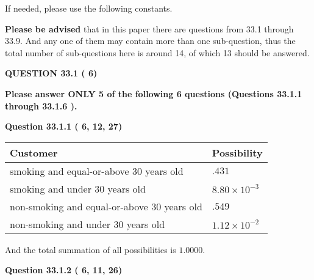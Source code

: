 \documentclass[12pt]{article}
\begin{document}
If needed, please use the following constants.
 
 
 
{\textbf{\large{Please be advised}}} that in this paper there are questions from
33.1 through
33.9.
And any one of them may contain more than one sub-question, thus the total number
of sub-questions here is around 14, of which
13 should be answered.
 
\vspace{0.3in}
 
 
   
   
  
\vspace{0.2in}
  
{\textbf{\Large{QUESTION
33.1 
 (          6)
}}}
  
  
{\textbf{\Large{Please answer ONLY  %
           5 %
 of the following  %
           6 %
 questions (Questions  %
33.1.1 %
 through  %
33.1.6 %
 ). }}}
   
   
  
\vspace{0.2in}
  
{\textbf{\Large{Question
33.1.1 
 (          6,         12,         27)
}}}
  
  
 
 
\noindent{}

 
\noindent
\begin{tabular}{|l|l|}
\hline
Customer & Possibility \\
\hline
smoking  and  %
equal-or-above 30 years old &
  $ %
.431$ \\
\hline
smoking  and  %
under 30 years old &
  $ %
8.80 \times 10^{-3}$ \\
\hline
 non-smoking and  %
equal-or-above 30 years old &
  $ %
.549$ \\
\hline
 non-smoking and  %
under 30 years old &
  $ %
1.12 \times 10^{-2}$ \\
\hline
\end{tabular}
 
\noindent
 And the total summation of all possibilities is $  %
1.0000 $.
 
 
 
  
\vspace{0.2in}
  
{\textbf{\Large{Question
33.1.2 
 (          6,         11,         26)
}}}
  
  
 
 
\noindent{}
\end{document}
